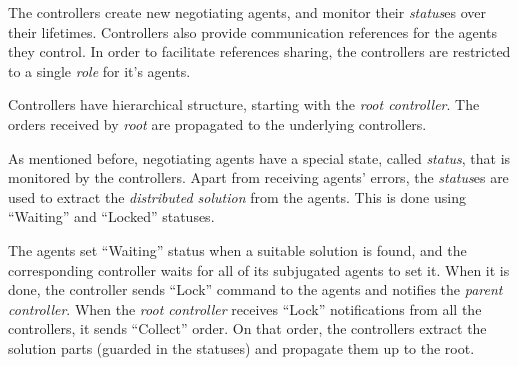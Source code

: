 The controllers create new negotiating agents, and monitor their \emph{status}es
over their lifetimes. Controllers also provide communication references for the
agents they control. In order to facilitate references sharing, the controllers
are restricted to a single \emph{role} for it's agents.

Controllers have hierarchical structure, starting with the \emph{root
  controller}. The orders received by \emph{root} are propagated to
the underlying controllers.

\medskip

As mentioned before, negotiating agents have a special state,
called \emph{status}, that is monitored by the controllers. Apart
from receiving agents' errors, the \emph{status}es are used to
extract the \emph{distributed solution} from the agents.
This is done using ``Waiting'' and ``Locked'' statuses.

The agents set ``Waiting'' status when a suitable solution is found,
and the corresponding controller waits for all of its subjugated
agents to set it. When it is done, the controller sends ``Lock''
command to the agents and notifies the \emph{parent controller}.
When the \emph{root controller} receives ``Lock'' notifications from
all the controllers, it sends ``Collect'' order. On that order, the controllers
extract the solution parts (guarded in the statuses) and propagate them up to
the root.










